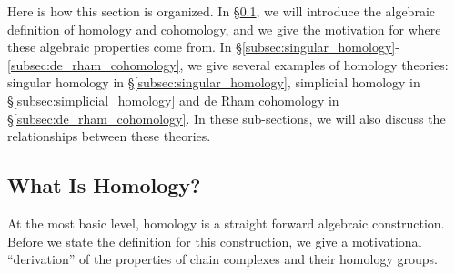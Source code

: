 \documentclass[12pt]{article}
\theoremstyle{definition}
\numberwithin{equation}{section}
\begin{document}
Here is how this section is organized. In \S \ref{subsec:what_is_homology}, we will introduce the algebraic definition of homology and cohomology, and we give the motivation for where these algebraic properties come from. In \S \ref{subsec:singular_homology}-\ref{subsec:de_rham_cohomology}, we give several examples of homology theories: singular homology in \S \ref{subsec:singular_homology}, simplicial homology in \S \ref{subsec:simplicial_homology} and de Rham cohomology in \S \ref{subsec:de_rham_cohomology}. In these sub-sections, we will also discuss the relationships between these theories.

\subsection{What Is Homology?} \label{subsec:what_is_homology} At the most basic level, homology is a straight forward algebraic construction. Before we state the definition for this construction, we give a motivational ``derivation'' of the properties of chain complexes and their homology groups.
\end{document}

